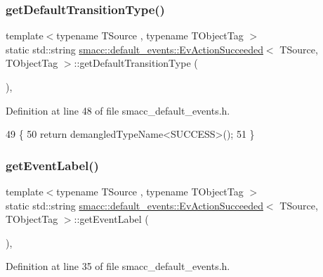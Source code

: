 \subsubsection{\texorpdfstring{get\+Default\+Transition\+Type()}{getDefaultTransitionType()}}
{\footnotesize\ttfamily template$<$typename T\+Source , typename T\+Object\+Tag $>$ \\
static std\+::string \hyperlink{structsmacc_1_1default__events_1_1EvActionSucceeded}{smacc\+::default\+\_\+events\+::\+Ev\+Action\+Succeeded}$<$ T\+Source, T\+Object\+Tag $>$\+::get\+Default\+Transition\+Type (\begin{DoxyParamCaption}{ }\end{DoxyParamCaption})\hspace{0.3cm}{\ttfamily [inline]}, {\ttfamily [static]}}



Definition at line 48 of file smacc\+\_\+default\+\_\+events.\+h.


\begin{DoxyCode}
49   \{
50     \textcolor{keywordflow}{return} demangledTypeName<SUCCESS>();
51   \}
\end{DoxyCode}
\mbox{\label{structsmacc_1_1default__events_1_1EvActionSucceeded_a8d002ec0ef39a71d54469fe274ac8c2a}} 
\subsubsection{\texorpdfstring{get\+Event\+Label()}{getEventLabel()}}
{\footnotesize\ttfamily template$<$typename T\+Source , typename T\+Object\+Tag $>$ \\
static std\+::string \hyperlink{structsmacc_1_1default__events_1_1EvActionSucceeded}{smacc\+::default\+\_\+events\+::\+Ev\+Action\+Succeeded}$<$ T\+Source, T\+Object\+Tag $>$\+::get\+Event\+Label (\begin{DoxyParamCaption}{ }\end{DoxyParamCaption})\hspace{0.3cm}{\ttfamily [inline]}, {\ttfamily [static]}}



Definition at line 35 of file smacc\+\_\+default\+\_\+events.\+h.


